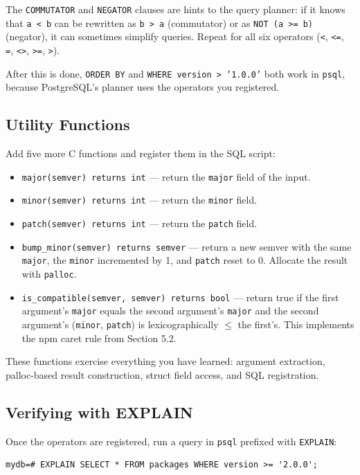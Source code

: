 \documentclass[11pt,a4paper]{article}
\begin{document}
The \texttt{COMMUTATOR} and \texttt{NEGATOR} clauses are hints to the query planner: if it knows that \texttt{a < b} can be rewritten as \texttt{b > a} (commutator) or as \texttt{NOT (a >= b)} (negator), it can sometimes simplify queries. Repeat for all six operators (\texttt{<}, \texttt{<=}, \texttt{=}, \texttt{<>}, \texttt{>=}, \texttt{>}).

After this is done, \texttt{ORDER BY} and \texttt{WHERE version > '1.0.0'} both work in \texttt{psql}, because PostgreSQL's planner uses the operators you registered.

\subsection{Utility Functions}
Add five more C functions and register them in the SQL script:

\begin{itemize}
\item \texttt{major(semver) returns int} --- return the \texttt{major} field of the input.
\item \texttt{minor(semver) returns int} --- return the \texttt{minor} field.
\item \texttt{patch(semver) returns int} --- return the \texttt{patch} field.
\item \texttt{bump\_minor(semver) returns semver} --- return a new semver with the same \texttt{major}, the \texttt{minor} incremented by 1, and \texttt{patch} reset to 0. Allocate the result with \texttt{palloc}.
\item \texttt{is\_compatible(semver, semver) returns bool} --- return true if the first argument's \texttt{major} equals the second argument's \texttt{major} and the second argument's (\texttt{minor}, \texttt{patch}) is lexicographically $\leq$ the first's. This implements the npm caret rule from Section 5.2.
\end{itemize}

These functions exercise everything you have learned: argument extraction, palloc-based result construction, struct field access, and SQL registration.

\subsection{Verifying with EXPLAIN}
Once the operators are registered, run a query in \texttt{psql} prefixed with \texttt{EXPLAIN}:

\begin{codebox}
\begin{lstlisting}
mydb=# EXPLAIN SELECT * FROM packages WHERE version >= '2.0.0';
\end{lstlisting}
\end{codebox}
\end{document}
